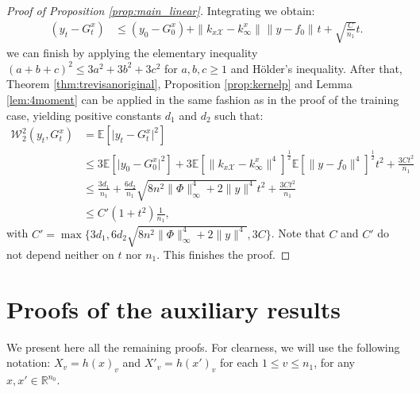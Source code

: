 \documentclass{article}
\theoremstyle{definition}
\theoremstyle{remark}
\numberwithin{equation}{section}
\newcommand{\X}{\mathcal{X}}
\newcommand{\R}{\mathbb{R}}
\newcommand{\E}{\mathbb{E}}
\newcommand{\ktest}{k_{x\X}}
\newcommand{\norm}[2]{
    \|#1\|_{#2}
}
\begin{document}
\begin{proof}[Proof of Proposition \ref{prop:main_linear}]
    Integrating we obtain:
    \begin{align}
        \label{eqaux_test2}
        (y_t-G_t^x) &\le (y_0-G_0^x) + \norm{\ktest-k_\infty^x}{} \norm{y-f_0}{} t +\sqrt{\frac{C}{n_1}}t.
    \end{align}
    we can finish by applying the elementary inequality $(a+b+c)^2 \le 3a^2+3b^2+3c^2$ for $a,b,c\ge 1$ and Hölder's inequality.
    After that, Theorem \ref{thm:trevisanoriginal}, Proposition \ref{prop:kernelp} and Lemma \ref{lem:4moment} can be applied in the same fashion as in the proof of the training case, 
    yielding positive constants $d_1$ and $d_2$ such that:
    \begin{align}
        \mathcal W_2^2(y_t,G_t^x) &= \E[\vert y_t-G_t^x\vert^2] \\
        &\le 3\E[\vert y_0-G_0^x\vert^2] + 3\E[\norm{\ktest-k_\infty^x}{}^4]^\frac{1}{2} \E[\norm{y-f_0}{}^4]^\frac{1}{2}t^2+\frac{3Ct^2}{n_1}\\
        &\le \frac{3d_1}{n_1} + \frac{6d_2}{n_1}\sqrt{8n^2\norm{\Phi}{\infty}^4 + 2\norm{y}{}^4}t^2+\frac{3Ct^2}{n_1}\\
        &\le C'(1+t^2)\frac{1}{n_1},
    \end{align}
    with $C' = \max\{3d_1,6d_2\sqrt{8n^2\norm{\Phi}{\infty}^4 + 2\norm{y}{}^4},3C\}$.
    Note that $C$ and $C'$ do not depend neither on $t$ nor $n_1$.
    This finishes the proof.

%
\end{proof}


\section{Proofs of the auxiliary results}
\label{ap:proofs}

We present here all the  remaining proofs.
For clearness, we will use the following notation: $X_v = h(x)_v$ and $X'_v = h(x')_v$ for each $1 \le v \le n_1$, for any $x,x'\in \R^{n_0}$.
\end{document}
